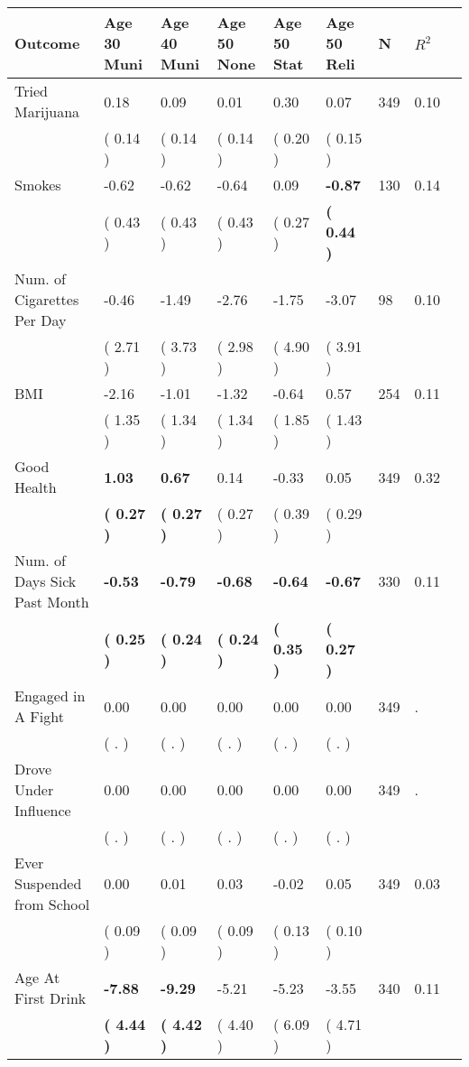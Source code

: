 \begin{tabular}{L{6.2cm} C{1.8cm} C{1.8cm} C{1.8cm} C{1.8cm} C{1.8cm} C{1.8cm} C{0.3cm} C{0.3cm}}
\toprule
 \textbf{Outcome} & \textbf{Age 30 Muni} & \textbf{Age 40 Muni} & \textbf{Age 50 None} & \textbf{Age 50 Stat} & \textbf{Age 50 Reli} & \textbf{N} & \textbf{$ R^2$} \\
\midrule
Tried Marijuana &      0.18 &      0.09 &      0.01 &      0.30 &      0.07  & 349 &       0.10 \\ 
 & (     0.14 ) & (     0.14 ) & (     0.14 ) & (     0.20 ) & (     0.15 )  & \\
Smokes &     -0.62 &     -0.62 &     -0.64 &      0.09 & \textbf{    -0.87}  & 130 &       0.14 \\ 
 & (     0.43 ) & (     0.43 ) & (     0.43 ) & (     0.27 ) & \textbf{(     0.44 )}  & \\
Num. of Cigarettes Per Day &     -0.46 &     -1.49 &     -2.76 &     -1.75 &     -3.07  & 98 &       0.10 \\ 
 & (     2.71 ) & (     3.73 ) & (     2.98 ) & (     4.90 ) & (     3.91 )  & \\
BMI &     -2.16 &     -1.01 &     -1.32 &     -0.64 &      0.57  & 254 &       0.11 \\ 
 & (     1.35 ) & (     1.34 ) & (     1.34 ) & (     1.85 ) & (     1.43 )  & \\
Good Health & \textbf{     1.03} & \textbf{     0.67} &      0.14 &     -0.33 &      0.05  & 349 &       0.32 \\ 
 & \textbf{(     0.27 )} & \textbf{(     0.27 )} & (     0.27 ) & (     0.39 ) & (     0.29 )  & \\
Num. of Days Sick Past Month & \textbf{    -0.53} & \textbf{    -0.79} & \textbf{    -0.68} & \textbf{    -0.64} & \textbf{    -0.67}  & 330 &       0.11 \\ 
 & \textbf{(     0.25 )} & \textbf{(     0.24 )} & \textbf{(     0.24 )} & \textbf{(     0.35 )} & \textbf{(     0.27 )}  & \\
Engaged in A Fight &      0.00 &      0.00 &      0.00 &      0.00 &      0.00  & 349 &          . \\ 
 & (        . ) & (        . ) & (        . ) & (        . ) & (        . )  & \\
Drove Under Influence &      0.00 &      0.00 &      0.00 &      0.00 &      0.00  & 349 &          . \\ 
 & (        . ) & (        . ) & (        . ) & (        . ) & (        . )  & \\
Ever Suspended from School &      0.00 &      0.01 &      0.03 &     -0.02 &      0.05  & 349 &       0.03 \\ 
 & (     0.09 ) & (     0.09 ) & (     0.09 ) & (     0.13 ) & (     0.10 )  & \\
Age At First Drink & \textbf{    -7.88} & \textbf{    -9.29} &     -5.21 &     -5.23 &     -3.55  & 340 &       0.11 \\ 
 & \textbf{(     4.44 )} & \textbf{(     4.42 )} & (     4.40 ) & (     6.09 ) & (     4.71 )  & \\
\bottomrule
\end{tabular}
